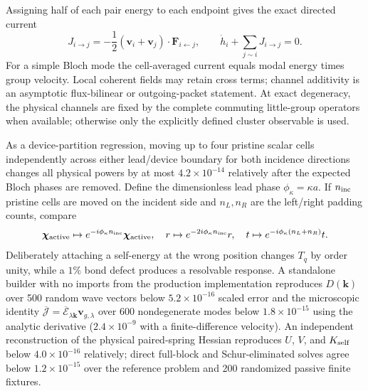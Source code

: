 \documentclass[10pt,aps,onecolumn,notitlepage,nofootinbib]{revtex4-2}
\newcommand{\vk}{\bm k}
\newcommand{\vchi}{\bm\chi}
\begin{document}
Assigning half of each pair energy to each endpoint gives the exact directed current
\begin{equation}
 J_{i\to j}=-\frac12(\bm v_i+\bm v_j)\cdot\bm F_{i\leftarrow j},
 \qquad
 \dot h_i+\sum_{j\sim i}J_{i\to j}=0.
\end{equation}
For a simple Bloch mode the cell-averaged current equals modal energy times group velocity.  Local coherent fields may retain cross terms; channel additivity is an asymptotic flux-bilinear or outgoing-packet statement.  At exact degeneracy, the physical channels are fixed by the complete commuting little-group operators when available; otherwise only the explicitly defined cluster observable is used.

As a device-partition regression, moving up to four pristine scalar cells independently across either lead/device boundary for both incidence directions changes all physical powers by at most $4.2\times10^{-14}$ relatively after the expected Bloch phases are removed. Define the dimensionless lead phase $\phi_\kappa=\kappa a$. If $n_{\rm inc}$ pristine cells are moved on the incident side and $n_L,n_R$ are the left/right padding counts, compare
\begin{equation}
 \vchi_{\rm active}\mapsto e^{-i\phi_\kappa n_{\rm inc}}\vchi_{\rm active},
 \quad r\mapsto e^{-2i\phi_\kappa n_{\rm inc}}r,
 \quad t\mapsto e^{-i\phi_\kappa(n_L+n_R)}t.
\end{equation} Deliberately attaching a self-energy at the wrong position changes $T_q$ by order unity, while a $1\%$ bond defect produces a resolvable response. A standalone builder with no imports from the production implementation reproduces $D(\vk)$ over 500 random wave vectors below $5.2\times10^{-16}$ scaled error and the microscopic identity $\overline{\bm{\mathcal J}}=\overline{\mathcal E}_{\lambda\bm k}\bm v_{g,\lambda}$ over 600 nondegenerate modes below $1.8\times10^{-15}$ using the analytic derivative ($2.4\times10^{-9}$ with a finite-difference velocity). An independent reconstruction of the physical paired-spring Hessian reproduces $U$, $V$, and $K_{\rm self}$ below $4.0\times10^{-16}$ relatively; direct full-block and Schur-eliminated solves agree below $1.2\times10^{-15}$ over the reference problem and 200 randomized passive finite fixtures.
\end{document}
